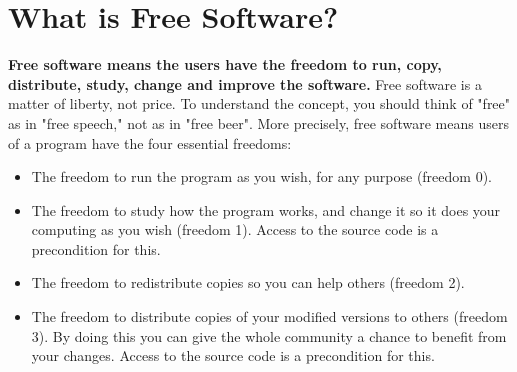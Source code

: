 \documentclass[12pt,a4paper]{article}
\begin{document}
	\section{What is Free Software?}
	\textbf{Free software means the users have the freedom to run, copy, distribute, study, change and improve the software.} Free software is a matter of liberty, not price. To understand the concept, you should think of "free" as in "free speech," not as in "free beer". More precisely, free software means users of a program have the four essential freedoms:
	\begin{itemize}
		\item The freedom to run the program as you wish, for any purpose (freedom 0).
		\item The freedom to study how the program works, and change it so it does your computing as you wish (freedom 1). Access to the source code is a precondition for this.
		\item The freedom to redistribute copies so you can help others (freedom 2).
		\item The freedom to distribute copies of your modified versions to others (freedom 3). By doing this you can give the whole community a chance to benefit from your changes. Access to the source code is a precondition for this.
	\end{itemize}
	
\end{document}
